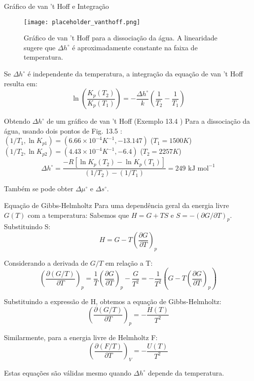 \documentclass{beamer}
\begin{document}
\begin{frame}{Gráfico de van 't Hoff e Integração}
    \begin{figure}
    \centering
    \texttt{[image: placeholder\_vanthoff.png]}
    \caption{Gráfico de van 't Hoff para a dissociação da água. A linearidade sugere que $\Delta h^{\circ}$ é aproximadamente constante na faixa de temperatura. }
    \end{figure}
    
    Se $\Delta h^{\circ}$ é independente da temperatura, a integração da equação de van 't Hoff resulta em:
    $$ \ln\left(\frac{K_p(T_2)}{K_p(T_1)}\right) = -\frac{\Delta h^{\circ}}{k}\left(\frac{1}{T_2} - \frac{1}{T_1}\right) $$
     
    \begin{exampleblock}{Obtendo $\Delta h^{\circ}$ de um gráfico de van 't Hoff (Exemplo 13.4 )}
        Para a dissociação da água, usando dois pontos de Fig. 13.5 :
        $(1/T_1, \ln K_{p1}) = (6.66 \times 10^{-4} K^{-1}, -13.147)$ ($T_1=1500K$) 
        $(1/T_2, \ln K_{p2}) = (4.43 \times 10^{-4} K^{-1}, -6.4)$ ($T_2=2257K$) 
        $$ \Delta h^{\circ} = \frac{-R[\ln K_p(T_2) - \ln K_p(T_1)]}{(1/T_2) - (1/T_1)} = 249 \text{ kJ mol}^{-1} $$
        
        Também se pode obter $\Delta\mu^{\circ}$ e $\Delta s^{\circ}$. 
    \end{exampleblock}
\end{frame}

\begin{frame}{Equação de Gibbs-Helmholtz}
    Para uma dependência geral da energia livre $G(T)$ com a temperatura: 
    Sabemos que $H = G + TS$ e $S = -(\partial G/\partial T)_p$. 
    Substituindo S:
    $$ H = G - T\left(\frac{\partial G}{\partial T}\right)_p $$
     
    Considerando a derivada de $G/T$ em relação a T:
    $$ \left(\frac{\partial (G/T)}{\partial T}\right)_p = \frac{1}{T}\left(\frac{\partial G}{\partial T}\right)_p - \frac{G}{T^2} = -\frac{1}{T^2}\left(G - T\left(\frac{\partial G}{\partial T}\right)_p\right) $$
     
    Substituindo a expressão de H, obtemos a equação de Gibbs-Helmholtz:
    $$ \left(\frac{\partial (G/T)}{\partial T}\right)_p = -\frac{H(T)}{T^2} $$
    
    Similarmente, para a energia livre de Helmholtz F:
    $$ \left(\frac{\partial (F/T)}{\partial T}\right)_V = -\frac{U(T)}{T^2} $$
    
    Estas equações são válidas mesmo quando $\Delta h^{\circ}$ depende da temperatura. 
\end{frame}
\end{document}
